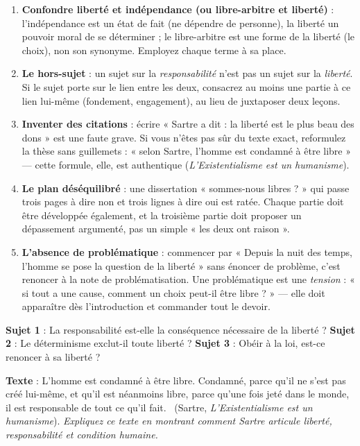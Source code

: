 \documentclass[11pt]{article}
\begin{document}
\begin{attention}
\begin{enumerate}
\item \textbf{Confondre liberté et indépendance (ou libre-arbitre et liberté)} : l'indépendance est un état de fait (ne dépendre de personne), la liberté un pouvoir moral de se déterminer ; le libre-arbitre est une forme de la liberté (le choix), non son synonyme. Employez chaque terme à sa place.
\item \textbf{Le hors-sujet} : un sujet sur la \emph{responsabilité} n'est pas un sujet sur la \emph{liberté}. Si le sujet porte sur le lien entre les deux, consacrez au moins une partie à ce lien lui-même (fondement, engagement), au lieu de juxtaposer deux leçons.
\item \textbf{Inventer des citations} : écrire « Sartre a dit : la liberté est le plus beau des dons » est une faute grave. Si vous n'êtes pas sûr du texte exact, reformulez la thèse sans guillemets : « selon Sartre, l'homme est condamné à être libre » — cette formule, elle, est authentique (\emph{L'Existentialisme est un humanisme}).
\item \textbf{Le plan déséquilibré} : une dissertation « sommes-nous libres ? » qui passe trois pages à dire non et trois lignes à dire oui est ratée. Chaque partie doit être développée également, et la troisième partie doit proposer un dépassement argumenté, pas un simple « les deux ont raison ».
\item \textbf{L'absence de problématique} : commencer par « Depuis la nuit des temps, l'homme se pose la question de la liberté » sans énoncer de problème, c'est renoncer à la note de problématisation. Une problématique est une \emph{tension} : « si tout a une cause, comment un choix peut-il être libre ? » — elle doit apparaître dès l'introduction et commander tout le devoir.
\end{enumerate}
\end{attention}

\begin{exercice}
\textbf{Sujet 1} : La responsabilité est-elle la conséquence nécessaire de la liberté ?
\textbf{Sujet 2} : Le déterminisme exclut-il toute liberté ?
\textbf{Sujet 3} : Obéir à la loi, est-ce renoncer à sa liberté ?
\end{exercice}

\begin{exercice}
\textbf{Texte} : \guillemotleft L'homme est condamné à être libre. Condamné, parce qu'il ne s'est pas créé lui-même, et qu'il est néanmoins libre, parce qu'une fois jeté dans le monde, il est responsable de tout ce qu'il fait. \guillemotright\ (Sartre, \emph{L'Existentialisme est un humanisme}).
\textit{Expliquez ce texte en montrant comment Sartre articule liberté, responsabilité et condition humaine.}
\end{exercice}
\end{document}
